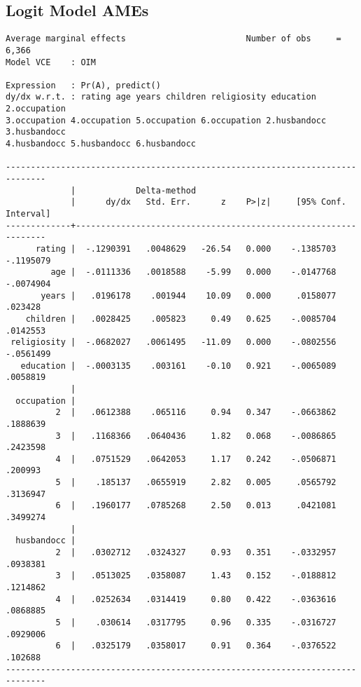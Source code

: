 \documentclass{article}
\begin{document}
\newpage
\hypertarget{logitame}{\subsection*{Logit Model AMEs}}
\begin{verbatim}
Average marginal effects                        Number of obs     =      6,366
Model VCE    : OIM

Expression   : Pr(A), predict()
dy/dx w.r.t. : rating age years children religiosity education 2.occupation 
3.occupation 4.occupation 5.occupation 6.occupation 2.husbandocc 3.husbandocc 
4.husbandocc 5.husbandocc 6.husbandocc

------------------------------------------------------------------------------
             |            Delta-method
             |      dy/dx   Std. Err.      z    P>|z|     [95% Conf. Interval]
-------------+----------------------------------------------------------------
      rating |  -.1290391   .0048629   -26.54   0.000    -.1385703   -.1195079
         age |  -.0111336   .0018588    -5.99   0.000    -.0147768   -.0074904
       years |   .0196178    .001944    10.09   0.000     .0158077     .023428
    children |   .0028425    .005823     0.49   0.625    -.0085704    .0142553
 religiosity |  -.0682027   .0061495   -11.09   0.000    -.0802556   -.0561499
   education |  -.0003135    .003161    -0.10   0.921    -.0065089    .0058819
             |
  occupation |
          2  |   .0612388    .065116     0.94   0.347    -.0663862    .1888639
          3  |   .1168366   .0640436     1.82   0.068    -.0086865    .2423598
          4  |   .0751529   .0642053     1.17   0.242    -.0506871     .200993
          5  |    .185137   .0655919     2.82   0.005     .0565792    .3136947
          6  |   .1960177   .0785268     2.50   0.013     .0421081    .3499274
             |
  husbandocc |
          2  |   .0302712   .0324327     0.93   0.351    -.0332957    .0938381
          3  |   .0513025   .0358087     1.43   0.152    -.0188812    .1214862
          4  |   .0252634   .0314419     0.80   0.422    -.0363616    .0868885
          5  |    .030614   .0317795     0.96   0.335    -.0316727    .0929006
          6  |   .0325179   .0358017     0.91   0.364    -.0376522     .102688
------------------------------------------------------------------------------
\end{verbatim}
\end{document}
